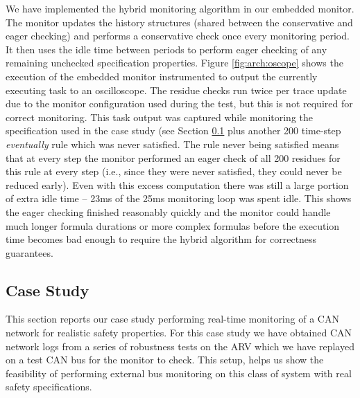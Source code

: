 We have implemented the hybrid monitoring algorithm in our embedded monitor. The monitor updates the history structures (shared between the conservative and eager checking) and performs a conservative check once every monitoring period. It then uses the idle time between periods to perform eager checking of any remaining unchecked specification properties.
%
Figure \ref{fig:arch:oscope} shows the execution of the embedded monitor instrumented to output the currently executing task to an oscilloscope. The residue checks run twice per trace update due to the monitor configuration used during the test, but this is not required for correct monitoring.
This task output was captured while monitoring the specification used in the case study (see Section \ref{sec:case_study} plus another 200 time-step \emph{eventually} rule which was never satisfied. 
The rule never being satisfied means that at every step the monitor performed an eager check of all 200 residues for this rule at every step (i.e., since they were never satisfied, they could never be reduced early). 
Even with this excess computation there was still a large portion of extra idle time -- 23ms of the 25ms monitoring loop was spent idle. 
This shows the eager checking finished reasonably quickly and the monitor could handle much longer formula durations or more complex formulas before the execution time becomes bad enough to require the hybrid algorithm for correctness guarantees. 

\subsection{Case Study}
\label{sec:case_study}
This section reports our case study performing real-time monitoring of a CAN network for realistic safety properties. 
For this case study we have obtained CAN network logs from a series of robustness tests on the ARV which we have replayed on a test CAN bus for the monitor to check. 
This setup, %
helps us show the feasibility of performing external bus monitoring on this class of system with real safety specifications.


